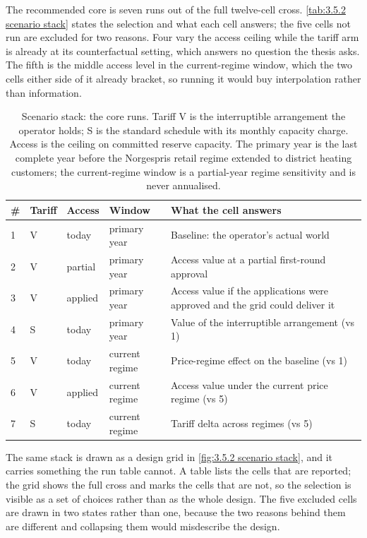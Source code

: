 The recommended core is seven runs out of the full twelve-cell cross. \autoref{tab:3.5.2 scenario stack} states the selection and what each cell answers; the five cells not run are excluded for two reasons. Four vary the access ceiling while the tariff arm is already at its counterfactual setting, which answers no question the thesis asks. The fifth is the middle access level in the current-regime window, which the two cells either side of it already bracket, so running it would buy interpolation rather than information.

\begin{table}[h]
\centering
\caption{Scenario stack: the core runs. Tariff V is the interruptible arrangement the operator holds; S is the standard schedule with its monthly capacity charge. Access is the ceiling on committed reserve capacity. The primary year is the last complete year before the Norgespris retail regime extended to district heating customers; the current-regime window is a partial-year regime sensitivity and is never annualised.}
\small
\begin{tabular}{p{0.5cm} p{1.5cm} p{1.7cm} p{2.6cm} p{6.4cm}}
\toprule
\textbf{\#} & \textbf{Tariff} & \textbf{Access} & \textbf{Window} & \textbf{What the cell answers} \\
\midrule
1 & V & today & primary year & Baseline: the operator's actual world \\
2 & V & partial & primary year & Access value at a partial first-round approval \\
3 & V & applied & primary year & Access value if the applications were approved and the grid could deliver it \\
4 & S & today & primary year & Value of the interruptible arrangement (vs 1) \\
5 & V & today & current regime & Price-regime effect on the baseline (vs 1) \\
6 & V & applied & current regime & Access value under the current price regime (vs 5) \\
7 & S & today & current regime & Tariff delta across regimes (vs 5) \\
\bottomrule
\end{tabular}
\label{tab:3.5.2 scenario stack}
\end{table}

The same stack is drawn as a design grid in \autoref{fig:3.5.2 scenario stack}, and it carries something the run table cannot. A table lists the cells that are reported; the grid shows the full cross and marks the cells that are not, so the selection is visible as a set of choices rather than as the whole design. The five excluded cells are drawn in two states rather than one, because the two reasons behind them are different and collapsing them would misdescribe the design.

